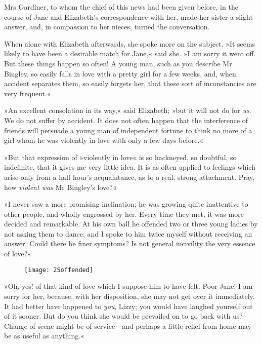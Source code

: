 Mrs Gardiner, to whom the chief of this news had been given before, in the course of Jane and Elizabeth's correspondence with her, made her sister a slight answer, and, in compassion to her nieces, turned the conversation.

When alone with Elizabeth afterwards, she spoke more on the subject. »It seems likely to have been a desirable match for Jane,« said she. »I am sorry it went off. But these things happen so often! A young man, such as you describe Mr Bingley, so easily falls in love with a pretty girl for a few weeks, and, when accident separates them, so easily forgets her, that these sort of inconstancies are very frequent.«

»An excellent consolation in its way,« said Elizabeth; »but it will not do for \textit{us}. We do not suffer by accident. It does not often happen that the interference of friends will persuade a young man of independent fortune to think no more of a girl whom he was violently in love with only a few days before.«

»But that expression of »violently in love« is so hackneyed, so doubtful, so indefinite, that it gives me very little idea. It is as often applied to feelings which arise only from a half hour's acquaintance, as to a real, strong attachment. Pray, how \textit{violent was} Mr Bingley's love?«

»I never saw a more promising inclination; he was growing quite inattentive to other people, and wholly engrossed by her. Every time they met, it was more decided and remarkable. At his own ball he offended two or three young ladies by not asking them to dance; and I spoke to him twice myself without receiving an answer. Could there be finer symptoms? Is not general incivility the very essence of love?«


\begin{figure}[tbh]
\centering
\texttt{[image: 25offended]}
\end{figure}


»Oh, yes! of that kind of love which I suppose him to have felt. Poor Jane! I am sorry for her, because, with her disposition, she may not get over it immediately. It had better have happened to \textit{you}, Lizzy; you would have laughed yourself out of it sooner. But do you think she would be prevailed on to go back with us? Change of scene might be of service—and perhaps a little relief from home may be as useful as anything.«

